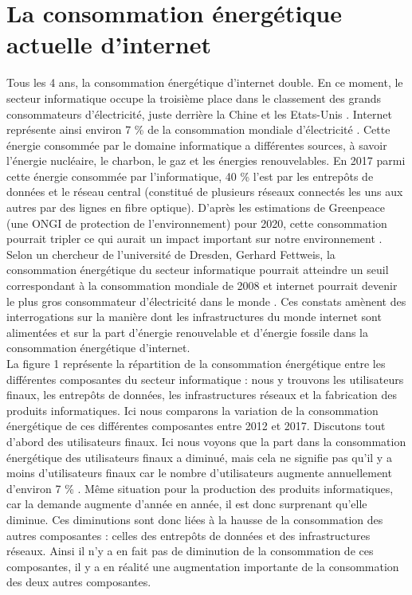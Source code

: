 \documentclass[a4paper,twocolumn,12pt]{article}
\begin{document}
\section{La consommation énergétique actuelle d'internet}

	Tous les 4 ans, la consommation énergétique d'internet double. En ce moment, le secteur informatique occupe la troisième place dans le classement des grands consommateurs d'électricité, juste derrière la Chine et les Etats-Unis \cite{2}. Internet représente ainsi environ 7 \% de la consommation mondiale d’électricité \cite{3}. Cette énergie consommée par le domaine informatique a différentes sources, à savoir l’énergie nucléaire, le charbon, le gaz et les énergies renouvelables. En 2017 parmi cette énergie consommée par l’informatique, 40 \% l’est par les entrepôts de données et le réseau central (constitué de plusieurs réseaux connectés les uns aux autres par des lignes en fibre optique). D'après les estimations de Greenpeace (une ONGI de protection de l'environnement) pour 2020, cette consommation pourrait tripler ce qui aurait un impact important sur notre environnement \cite{3}. Selon un chercheur de l'université de Dresden, Gerhard Fettweis, la consommation énergétique du secteur informatique pourrait atteindre un seuil correspondant à la consommation mondiale de 2008 et internet pourrait devenir le plus gros consommateur d'électricité dans le monde \cite{2}. Ces constats amènent des interrogations sur la manière dont les infrastructures du monde internet sont alimentées et sur la part d'énergie renouvelable et d'énergie fossile dans la consommation énergétique d’internet. \\
	
	La figure 1 représente la répartition de la consommation énergétique entre les différentes composantes du secteur informatique : nous y trouvons les utilisateurs finaux, les entrepôts de données, les infrastructures réseaux et la fabrication des produits informatiques. Ici nous comparons la variation de la consommation énergétique de ces différentes composantes entre 2012 et 2017. Discutons tout d’abord des utilisateurs finaux. Ici nous voyons que la part dans la consommation énergétique des utilisateurs finaux a diminué, mais cela ne signifie pas qu'il y a moins d’utilisateurs finaux car le nombre d’utilisateurs augmente annuellement d'environ 7 \% \cite{4}. Même situation pour la production des produits informatiques, car la demande augmente d’année en année, il est donc surprenant qu’elle diminue. Ces diminutions sont donc liées à la hausse de la consommation des autres composantes : celles des entrepôts de données et des infrastructures réseaux. Ainsi il n’y a en fait pas de diminution de la consommation de ces composantes, il y a en réalité une augmentation importante de la consommation des deux autres composantes.
\end{document}
